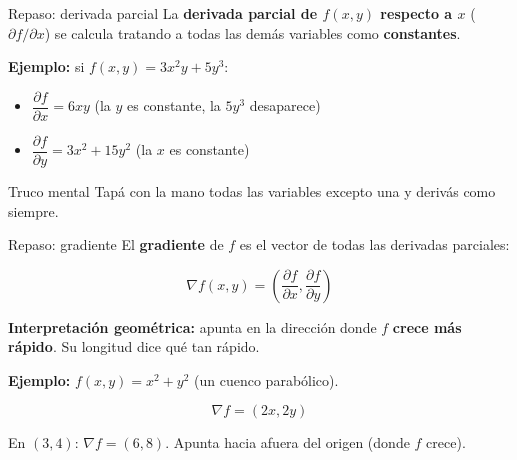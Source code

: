 \documentclass{beamer}
\begin{document}


\begin{frame}{Repaso: derivada parcial}
    \small
    La \textbf{derivada parcial de $f(x, y)$ respecto a $x$} ($\partial f / \partial x$) se calcula tratando a todas las demás variables como \textbf{constantes}.

    \vspace{0.5em}

    \textbf{Ejemplo:} si $f(x, y) = 3x^2 y + 5y^3$:

    \begin{itemize}
        \item $\dfrac{\partial f}{\partial x} = 6xy$ (la $y$ es constante, la $5y^3$ desaparece)
        \item $\dfrac{\partial f}{\partial y} = 3x^2 + 15y^2$ (la $x$ es constante)
    \end{itemize}

    \vspace{0.5em}

    \begin{alertblock}{Truco mental}
        Tapá con la mano todas las variables excepto una y derivás como siempre.
    \end{alertblock}
\end{frame}

\begin{frame}{Repaso: gradiente}
    \small
    El \textbf{gradiente} de $f$ es el vector de todas las derivadas parciales:

    \[
    \nabla f(x, y) = \left( \frac{\partial f}{\partial x}, \frac{\partial f}{\partial y} \right)
    \]

    \vspace{0.5em}

    \textbf{Interpretación geométrica:} apunta en la dirección donde $f$ \textbf{crece más rápido}. Su longitud dice qué tan rápido.

    \vspace{0.5em}

    \textbf{Ejemplo:} $f(x, y) = x^2 + y^2$ (un cuenco parabólico).

    \[
    \nabla f = (2x, 2y)
    \]

    En $(3, 4)$: $\nabla f = (6, 8)$. Apunta hacia afuera del origen (donde $f$ crece).
\end{frame}
\end{document}
